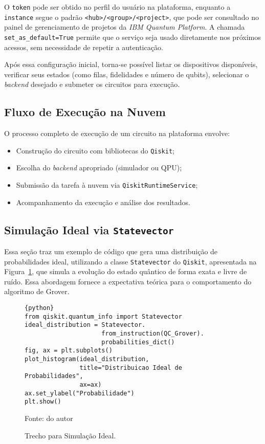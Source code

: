 O \texttt{token} pode ser obtido no perfil do usuário na plataforma, enquanto a \texttt{instance} segue o padrão \texttt{<hub>/<group>/<project>}, que pode ser consultado no painel de gerenciamento de projetos da \textit{IBM Quantum Platform}. A chamada \verb|set_as_default=True| permite que o serviço seja usado diretamente nos próximos acessos, sem necessidade de repetir a autenticação.

Após essa configuração inicial, torna-se possível listar os dispositivos disponíveis, verificar seus estados (como filas, fidelidades e número de qubits), selecionar o \textit{backend} desejado e submeter os circuitos para execução.

\subsection*{Fluxo de Execução na Nuvem}

O processo completo de execução de um circuito na plataforma envolve:

\begin{itemize}
    \item Construção do circuito com bibliotecas do \texttt{Qiskit};
    \item Escolha do \textit{backend} apropriado (simulador ou QPU);
    \item Submissão da tarefa à nuvem via \texttt{QiskitRuntimeService};
    \item Acompanhamento da execução e análise dos resultados.
\end{itemize}

\subsection{Simulação Ideal via \texttt{Statevector}}
\label{subSec: simulacaoIdeal}

Essa seção traz um exemplo de código que gera uma distribuição de probabilidades ideal, utilizando a classe \texttt{Statevector} do \texttt{Qiskit}, apresentada na Figura~\ref{cod:simulacaoIdeol}, que simula a evolução do estado quântico de forma exata e livre de ruído. Essa abordagem fornece a expectativa teórica para o comportamento do algoritmo de Grover.

\begin{figure}[!htb]
\centering
\caption{Trecho para Simulação Ideal.} 
\begin{lstlisting}{python}
from qiskit.quantum_info import Statevector
ideal_distribution = Statevector.
                     from_instruction(QC_Grover).
                     probabilities_dict()
fig, ax = plt.subplots()
plot_histogram(ideal_distribution, 
               title="Distribuicao Ideal de Probabilidades",
               ax=ax)
ax.set_ylabel("Probabilidade")
plt.show()
\end{lstlisting}
{\small Fonte: do autor} 
\label{cod:simulacaoIdeol} 
\end{figure}

